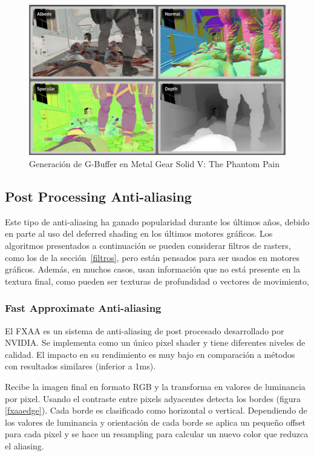 \documentclass[withindex, glossary]{cam-thesis}
\begin{document}
\begin{figure}[!htbp]
    \includegraphics[width=\linewidth]{figures/gbuffer.png}
    \caption{Generación de G-Buffer en Metal Gear Solid V\@: The Phantom Pain\cite{analysismgsv}}
    \label{gbuffer}
\end{figure}

\subsection{Post Processing Anti-aliasing}

Este tipo de anti-aliasing ha ganado popularidad durante los últimos años, debido en parte al uso del deferred shading en los últimos motores gráficos. Los algoritmos presentados a continuación se pueden considerar filtros de rasters, como los de la sección~\ref{filtros}, pero están pensados para ser usados en motores gráficos. Además, en muchos casos, usan información que no está presente en la textura final, como pueden ser texturas de profundidad o vectores de movimiento,

\subsubsection{Fast Approximate Anti-aliasing}

El FXAA\cite{FXAA} es un sistema de anti-aliasing de post procesado desarrollado por NVIDIA\@. Se implementa como un único pixel shader y tiene diferentes niveles de calidad. El impacto en su rendimiento es muy bajo en comparación a métodos con resultados similares (inferior a 1ms).

Recibe la imagen final en formato RGB y la transforma en valores de luminancia por pixel. Usando el contraste entre pixels adyacentes detecta los bordes (figura \ref{fxaaedge}). Cada borde es clasificado como horizontal o vertical. Dependiendo de los valores de luminancia y orientación de cada borde se aplica un pequeño offset para cada pixel y se hace un resampling para calcular un nuevo color que reduzca el aliasing\cite{FXAA}\cite{fxaa2}.
\end{document}
